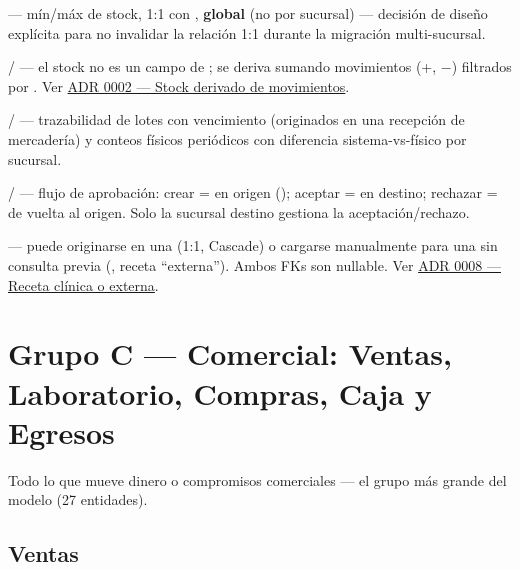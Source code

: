 \allowbreak {}\allowbreak {} --- mín/máx de stock, 1:1 con , \textbf{global} (no por sucursal) --- decisión de diseño explícita para no invalidar la relación 1:1 durante la migración multi-sucursal.

 /  --- el stock no es un campo de ; se deriva sumando movimientos (+, $-$) filtrados por . Ver \hyperref[adr:0002]{ADR 0002 --- Stock derivado de movimientos}.

 /  --- trazabilidad de lotes con vencimiento (originados en una recepción de mercadería) y conteos físicos periódicos con diferencia sistema-vs-físico por sucursal.

\allowbreak {} / \allowbreak {}\allowbreak {} --- flujo de aprobación: crear =  en origen (); aceptar =  en destino; rechazar =  de vuelta al origen. Solo la sucursal destino gestiona la aceptación/rechazo.

 --- puede originarse en una  (1:1, Cascade) o cargarse manualmente para una  sin consulta previa (, receta ``externa''). Ambos FKs son nullable. Ver \hyperref[adr:0008]{ADR 0008 --- Receta clínica o externa}.

\clearpage
\section{Grupo C --- Comercial: Ventas, Laboratorio, Compras, Caja y Egresos}
\label{sec:modelo-grupo-c}

Todo lo que mueve dinero o compromisos comerciales --- el grupo más grande del modelo (27 entidades).

\subsection{Ventas}

